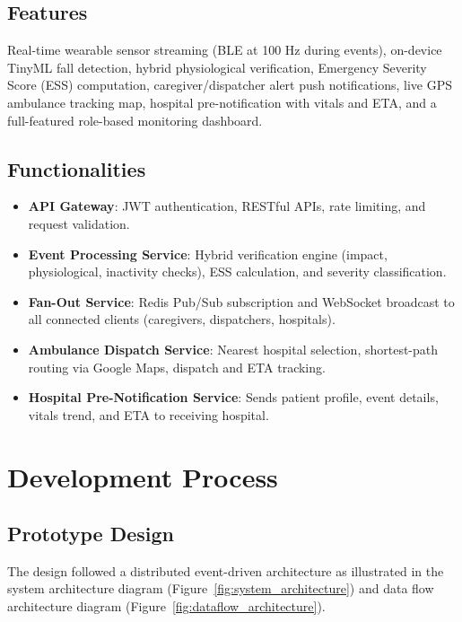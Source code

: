 \subsection{Features}

Real-time wearable sensor streaming (BLE at 100 Hz during events), on-device TinyML fall detection, hybrid physiological verification, Emergency Severity Score (ESS) computation, caregiver/dispatcher alert push notifications, live GPS ambulance tracking map, hospital pre-notification with vitals and ETA, and a full-featured role-based monitoring dashboard.

\subsection{Functionalities}

\begin{itemize}
\item \textbf{API Gateway}: JWT authentication, RESTful APIs, rate limiting, and request validation.
\item \textbf{Event Processing Service}: Hybrid verification engine (impact, physiological, inactivity checks), ESS calculation, and severity classification.
\item \textbf{Fan-Out Service}: Redis Pub/Sub subscription and WebSocket broadcast to all connected clients (caregivers, dispatchers, hospitals).
\item \textbf{Ambulance Dispatch Service}: Nearest hospital selection, shortest-path routing via Google Maps, dispatch and ETA tracking.
\item \textbf{Hospital Pre-Notification Service}: Sends patient profile, event details, vitals trend, and ETA to receiving hospital.
\end{itemize}

\section[Development Process]{\textbf{Development Process}}

\subsection{Prototype Design}

The design followed a distributed event-driven architecture as illustrated in the system architecture diagram (Figure~\ref{fig:system_architecture}) and data flow architecture diagram (Figure~\ref{fig:dataflow_architecture}).

